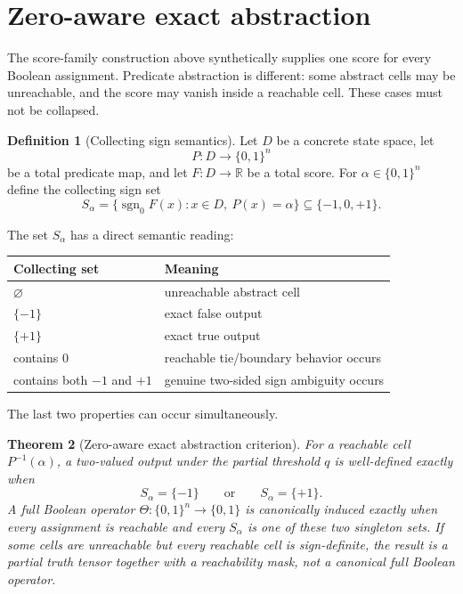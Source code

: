 \documentclass[11pt]{article}
\newtheorem{theorem}{Theorem}[section]
\theoremstyle{definition}
\newtheorem{definition}[theorem]{Definition}
\theoremstyle{remark}
\newcommand{\R}{\mathbb{R}}
\newcommand{\B}{\{0,1\}}
\newcommand{\sgnzero}{\operatorname{sgn}_0}
\begin{document}
\section{Zero-aware exact abstraction}\label{sec:collecting}

The score-family construction above synthetically supplies one score for every Boolean assignment. Predicate abstraction is different: some abstract cells may be unreachable, and the score may vanish inside a reachable cell. These cases must not be collapsed.

\begin{definition}[Collecting sign semantics]\label{def:collecting}
Let $D$ be a concrete state space, let
\[
 P:D\to\B^n
\]
be a total predicate map, and let $F:D\to\R$ be a total score. For $\alpha\in\B^n$ define the collecting sign set
\begin{equation}\label{eq:collecting}
 S_\alpha
 =\{\sgnzero F(x):x\in D,\ P(x)=\alpha\}
 \subseteq\{-1,0,+1\}.
\end{equation}
\end{definition}

The set $S_\alpha$ has a direct semantic reading:
\begin{center}
\begin{tabular}{@{}ll@{}}
\toprule
Collecting set & Meaning \\
\midrule
$\varnothing$ & unreachable abstract cell \\
$\{-1\}$ & exact false output \\
$\{+1\}$ & exact true output \\
contains $0$ & reachable tie/boundary behavior occurs \\
contains both $-1$ and $+1$ & genuine two-sided sign ambiguity occurs \\
\bottomrule
\end{tabular}
\end{center}
The last two properties can occur simultaneously.

\begin{theorem}[Zero-aware exact abstraction criterion]\label{thm:collecting}
For a reachable cell $P^{-1}(\alpha)$, a two-valued output under the partial threshold $q$ is well-defined exactly when
\[
 S_\alpha=\{-1\}
 \qquad\text{or}\qquad
 S_\alpha=\{+1\}.
\]
A full Boolean operator $\Theta:\B^n\to\B$ is canonically induced exactly when every assignment is reachable and every $S_\alpha$ is one of these two singleton sets. If some cells are unreachable but every reachable cell is sign-definite, the result is a partial truth tensor together with a reachability mask, not a canonical full Boolean operator.
\end{theorem}
\end{document}
